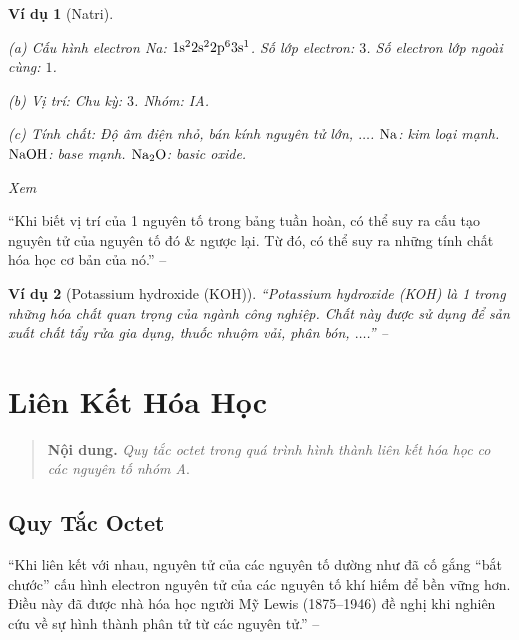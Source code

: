 \documentclass[oneside]{book}
\numberwithin{equation}{section}
\newtheorem{vidu}{Ví dụ}[section]
\begin{document}
\begin{vidu}[Natri]
	\begin{enumerate*}
		\item[(a)] \emph{Cấu hình electron Na:} $\rm 1s^22s^22p^63s^1$. Số lớp electron: $3$. Số electron lớp ngoài cùng: $1$.
		\item[(b)] \emph{Vị trí:} Chu kỳ: $3$. Nhóm: IA.
		\item[(c)] \emph{Tính chất:} Độ âm điện nhỏ, bán kính nguyên tử lớn, $\ldots$. $\rm Na$: kim loại mạnh. $\rm NaOH$: base mạnh. $\rm Na_2O$: basic oxide.
	\end{enumerate*}
	Xem \cite[Hình 7.1: \textsf{Mối quan hệ vị trí, cấu hình electron \& tính chất của sodium}, p. 50]{SGK_Hoa_Hoc_10_Chan_Troi_Sang_Tao}
\end{vidu}
``Khi biết vị trí của 1 nguyên tố trong bảng tuần hoàn, có thể suy ra cấu tạo nguyên tử của nguyên tố đó \& ngược lại. Từ đó, có thể suy ra những tính chất hóa học cơ bản của nó.'' -- \cite[p. 51]{SGK_Hoa_Hoc_10_Chan_Troi_Sang_Tao}

\begin{vidu}[Potassium hydroxide (KOH)]
	``\emph{Potassium hydroxide (KOH)} là 1 trong những hóa chất quan trọng của ngành công nghiệp. Chất này được sử dụng để sản xuất chất tẩy rửa gia dụng, thuốc nhuộm vải, phân bón, $\ldots$.'' -- \cite[p. 51]{SGK_Hoa_Hoc_10_Chan_Troi_Sang_Tao}
\end{vidu}


\chapter{Liên Kết Hóa Học}

\begin{quotation}
	\textbf{Nội dung.} \textit{Quy tắc octet trong quá trình hình thành liên kết hóa học co các nguyên tố nhóm A}.
\end{quotation}

\section{Quy Tắc Octet}
``Khi liên kết với nhau, nguyên tử của các nguyên tố dường như đã cố gắng ``bắt chước'' cấu hình electron nguyên tử của các nguyên tố khí hiếm để bền vững hơn. Điều này đã được nhà hóa học người Mỹ Lewis (1875--1946) đề nghị khi nghiên cứu về sự hình thành phân tử từ các nguyên tử.'' -- \cite[p. 52]{SGK_Hoa_Hoc_10_Chan_Troi_Sang_Tao}
\end{document}
